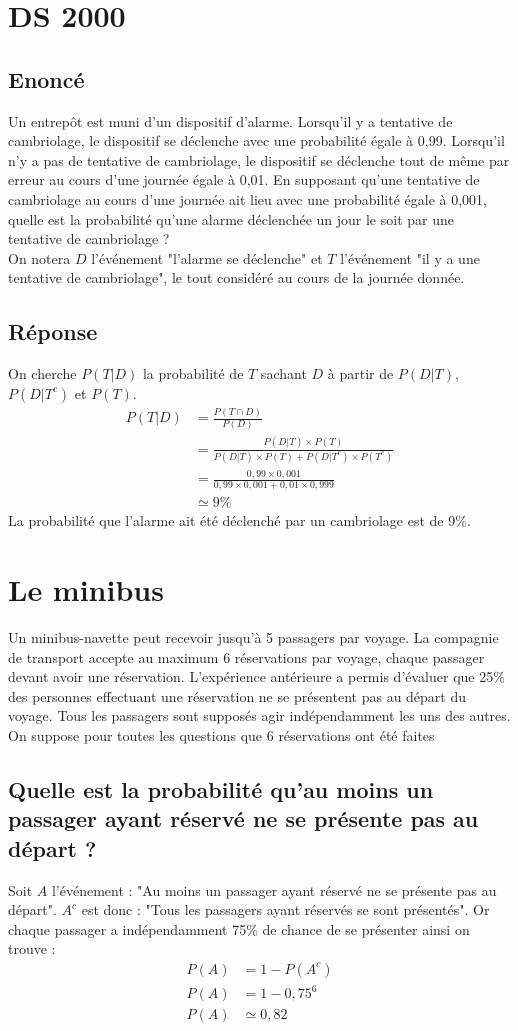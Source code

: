 \documentclass[10pt,a4paper,twoside]{article}
\begin{document}
\section{DS 2000}
\subsection*{Enoncé}
Un entrepôt est muni d'un dispositif d'alarme. Lorsqu'il y a tentative de cambriolage, le dispositif se déclenche avec une probabilité égale à 0,99. Lorsqu'il n'y a pas de tentative de cambriolage, le dispositif se déclenche tout de même par erreur au cours d'une journée égale à 0,01. En supposant qu'une tentative de cambriolage au cours d'une journée ait lieu avec une probabilité égale à 0,001, quelle est la probabilité qu'une alarme déclenchée un jour le soit par une tentative de cambriolage ?\\
On notera $D$ l'événement "l'alarme se déclenche" et $T$ l'événement "il y a une tentative de cambriolage", le tout considéré au cours de la journée donnée.
\subsection*{Réponse}
On cherche $P(T|D)$ la probabilité de $T$ sachant $D$ à partir de $P(D|T)$, $P(D|T^{c})$ et $P(T)$.
\begin{align*}
P(T|D) &=\frac{P(T\cap D)}{P(D)}\\
&= \frac{P(D|T)\times P(T)}{P(D|T)\times P(T) + P(D|T^{c}) \times P(T^{c})}\\
&= \frac{0,99 \times 0,001}{0,99\times 0,001 + 0,01 \times 0,999}\\
&\simeq 9\%
\end{align*}
La probabilité que l'alarme ait été déclenché par un cambriolage est de 9\%.

\section{Le minibus}
Un minibus-navette peut recevoir jusqu'à 5 passagers par voyage. La compagnie de transport accepte au maximum 6 réservations par voyage, chaque passager devant avoir une réservation. L'expérience antérieure a permis d'évaluer que 25\% des personnes effectuant une réservation ne se présentent pas au départ du voyage. Tous les passagers sont supposés agir indépendamment les uns des autres. On suppose pour toutes les questions que 6 réservations ont été faites

\subsection{Quelle est la probabilité qu'au moins un passager ayant réservé ne se présente pas au départ ?}
Soit $A$ l'événement : "Au moins un passager ayant réservé ne se présente pas au départ". $A^{c}$ est donc : "Tous les passagers ayant réservés se sont présentés". Or chaque passager a indépendamment 75\% de chance de se présenter ainsi on trouve :
\begin{align*}
P(A) &= 1-P(A^{c})\\
P(A) &= 1-0,75^{6}\\
P(A) &\simeq 0,82
\end{align*}
\end{document}
